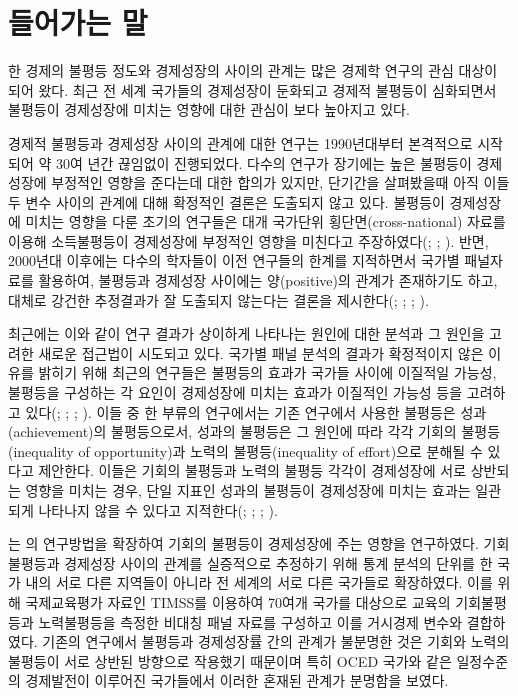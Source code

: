 \section{들어가는 말}
 한 경제의 불평등 정도와 경제성장의 사이의 관계는 많은 경제학 연구의 관심 대상이 되어 왔다.
 최근 전 세계 국가들의 경제성장이 둔화되고 경제적 불평등이 심화되면서 불평등이 경제성장에 미치는 영향에 대한 관심이 보다 높아지고 있다.
 
경제적 불평등과 경제성장 사이의 관계에 대한 연구는 1990년대부터 본격적으로 시작되어 약 30여 년간 끊임없이 진행되었다. 
다수의 연구가 장기에는 높은 불평등이 경제성장에 부정적인 영향을 준다는데 대한 합의가 있지만, 단기간을 살펴봤을때 아직 이들 두 변수 사이의 관계에 대해 확정적인 결론은 도출되지 않고 있다.
불평등이 경제성장에 미치는 영향을 다룬 초기의 연구들은 대개 국가단위 횡단면(cross-national) 자료를 이용해 소득불평등이 경제성장에 부정적인 영향을 미친다고 주장하였다(\cite{barro91}; \cite{anr94}; \cite{pnt94}).
반면, 2000년대 이후에는 다수의 학자들이 이전 연구들의 한계를 지적하면서 국가별 패널자료를 활용하여, 불평등과 경제성장 사이에는 양(positive)의 관계가 존재하기도 하고, 대체로 강건한 추정결과가 잘 도출되지 않는다는 결론을 제시한다(\cite{lnz98}; \cite{barro20}; \cite{forbes00}; \cite{bnd03}).

최근에는 이와 같이 연구 결과가 상이하게 나타나는 원인에 대한 분석과 그 원인을 고려한 새로운 접근법이 시도되고 있다.
국가별 패널 분석의 결과가 확정적이지 않은 이유를 밝히기 위해 최근의 연구들은 불평등의 효과가 국가들 사이에 이질적일 가능성, 불평등을 구성하는 각 요인이 경제성장에 미치는 효과가 이질적인 가능성 등을 고려하고 있다(\cite{voit05, voit11}; \cite{cc10}; \cite{hetl14}; \cite{mnr13,mnr14}).
이들 중 한 부류의 연구에서는 기존 연구에서 사용한 불평등은 성과(achievement)의 불평등으로서, 성과의 불평등은 그 원인에 따라 각각 기회의 불평등(inequality of opportunity)과 노력의 불평등(inequality of effort)으로 분해될 수 있다고 제안한다.
이들은 기회의 불평등과 노력의 불평등 각각이 경제성장에 서로 상반되는 영향을 미치는 경우, 단일 지표인 성과의 불평등이 경제성장에 미치는 효과는 일관되게 나타나지 않을 수 있다고 지적한다(\cite{mnr13, mnr14}; \cite{metl13}; \cite{fetl18}; \cite{ane20} ).

\cite{kno17}는 \cite{mnr13}의 연구방법을 확장하여 기회의 불평등이 경제성장에 주는 영향을 연구하였다.
기회불평등과 경제성장 사이의 관계를 실증적으로 추정하기 위해 통계 분석의 단위를 한 국가 내의 서로 다른 지역들이 아니라 전 세계의 서로 다른 국가들로 확장하였다.
이를 위해 국제교육평가 자료인 TIMSS를 이용하여 70여개 국가를 대상으로 교육의 기회불평등과 노력불평등을 측정한 비대칭 패널 자료를 구성하고 이를 거시경제 변수와 결합하였다.
기존의 연구에서 불평등과 경제성장률 간의 관계가 불분명한 것은 기회와 노력의 불평등이 서로 상반된 방향으로 작용했기 때문이며 특히 OCED 국가와 같은 일정수준의 경제발전이 이루어진 국가들에서 이러한 혼재된 관계가 분명함을 보였다.

